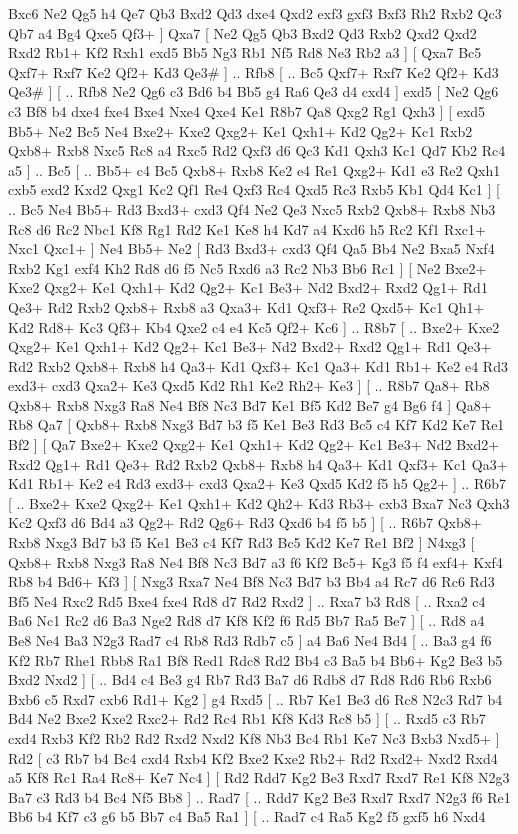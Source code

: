 Bxc6  Ne2 Qg5  h4 Qe7  Qb3 Bxd2  Qd3 dxe4  Qxd2 exf3  gxf3 Bxf3  Rh2 Rxb2  Qc3 Qb7  a4 Bg4  Qxe5 Qf3+   ]  Qxa7 [  Ne2 Qg5  Qb3 Bxd2  Qd3 Rxb2  Qxd2 Qxd2  Rxd2 Rb1+  Kf2 Rxh1  exd5 Bb5  Ng3 Rb1  Nf5 Rd8  Ne3 Rb2  a3   ]  [  Qxa7 Bc5  Qxf7+ Rxf7  Ke2 Qf2+  Kd3 Qe3#   ] .. Rfb8 [ .. Bc5  Qxf7+ Rxf7  Ke2 Qf2+  Kd3 Qe3#   ]  [ .. Rfb8  Ne2 Qg6  c3 Bd6  b4 Bb5  g4 Ra6  Qe3 d4  cxd4   ]  exd5 [  Ne2 Qg6  c3 Bf8  b4 dxe4  fxe4 Bxe4  Nxe4 Qxe4  Ke1 R8b7  Qa8 Qxg2  Rg1 Qxh3   ]  [  exd5 Bb5+  Ne2 Bc5  Ne4 Bxe2+  Kxe2 Qxg2+  Ke1 Qxh1+  Kd2 Qg2+  Kc1 Rxb2  Qxb8+ Rxb8  Nxc5 Rc8  a4 Rxc5  Rd2 Qxf3  d6 Qc3  Kd1 Qxh3  Kc1 Qd7  Kb2 Rc4  a5   ] .. Bc5 [ .. Bb5+  c4 Bc5  Qxb8+ Rxb8  Ke2 e4  Re1 Qxg2+  Kd1 e3  Re2 Qxh1  cxb5 exd2  Kxd2 Qxg1  Kc2 Qf1  Re4 Qxf3  Rc4 Qxd5  Rc3 Rxb5  Kb1 Qd4  Kc1   ]  [ .. Bc5  Ne4 Bb5+  Rd3 Bxd3+  cxd3 Qf4  Ne2 Qe3  Nxc5 Rxb2  Qxb8+ Rxb8  Nb3 Rc8  d6 Rc2  Nbc1 Kf8  Rg1 Rd2  Ke1 Ke8  h4 Kd7  a4 Kxd6  h5 Rc2  Kf1 Rxc1+  Nxc1 Qxc1+   ]  Ne4   Bb5+    Ne2 [  Rd3 Bxd3+  cxd3 Qf4  Qa5 Bb4  Ne2 Bxa5  Nxf4 Rxb2  Kg1 exf4  Kh2 Rd8  d6 f5  Nc5 Rxd6  a3 Rc2  Nb3 Bb6  Rc1   ]  [  Ne2 Bxe2+  Kxe2 Qxg2+  Ke1 Qxh1+  Kd2 Qg2+  Kc1 Be3+  Nd2 Bxd2+  Rxd2 Qg1+  Rd1 Qe3+  Rd2 Rxb2  Qxb8+ Rxb8  a3 Qxa3+  Kd1 Qxf3+  Re2 Qxd5+  Kc1 Qh1+  Kd2 Rd8+  Kc3 Qf3+  Kb4 Qxe2  c4 e4  Kc5 Qf2+  Kc6   ] .. R8b7 [ .. Bxe2+  Kxe2 Qxg2+  Ke1 Qxh1+  Kd2 Qg2+  Kc1 Be3+  Nd2 Bxd2+  Rxd2 Qg1+  Rd1 Qe3+  Rd2 Rxb2  Qxb8+ Rxb8  h4 Qa3+  Kd1 Qxf3+  Kc1 Qa3+  Kd1 Rb1+  Ke2 e4  Rd3 exd3+  cxd3 Qxa2+  Ke3 Qxd5  Kd2 Rh1  Ke2 Rh2+  Ke3   ]  [ .. R8b7  Qa8+ Rb8  Qxb8+ Rxb8  Nxg3 Ra8  Ne4 Bf8  Nc3 Bd7  Ke1 Bf5  Kd2 Be7  g4 Bg6  f4   ]  Qa8+   Rb8    Qa7 [  Qxb8+ Rxb8  Nxg3 Bd7  b3 f5  Ke1 Be3  Rd3 Bc5  c4 Kf7  Kd2 Ke7  Re1 Bf2   ]  [  Qa7 Bxe2+  Kxe2 Qxg2+  Ke1 Qxh1+  Kd2 Qg2+  Kc1 Be3+  Nd2 Bxd2+  Rxd2 Qg1+  Rd1 Qe3+  Rd2 Rxb2  Qxb8+ Rxb8  h4 Qa3+  Kd1 Qxf3+  Kc1 Qa3+  Kd1 Rb1+  Ke2 e4  Rd3 exd3+  cxd3 Qxa2+  Ke3 Qxd5  Kd2 f5  h5 Qg2+   ] .. R6b7 [ .. Bxe2+  Kxe2 Qxg2+  Ke1 Qxh1+  Kd2 Qh2+  Kd3 Rb3+  cxb3 Bxa7  Nc3 Qxh3  Kc2 Qxf3  d6 Bd4  a3 Qg2+  Rd2 Qg6+  Rd3 Qxd6  b4 f5  b5   ]  [ .. R6b7  Qxb8+ Rxb8  Nxg3 Bd7  b3 f5  Ke1 Be3  c4 Kf7  Rd3 Bc5  Kd2 Ke7  Re1 Bf2   ]  N4xg3 [  Qxb8+ Rxb8  Nxg3 Ra8  Ne4 Bf8  Nc3 Bd7  a3 f6  Kf2 Bc5+  Kg3 f5  f4 exf4+  Kxf4 Rb8  b4 Bd6+  Kf3   ]  [  Nxg3 Rxa7  Ne4 Bf8  Nc3 Bd7  b3 Bb4  a4 Rc7  d6 Rc6  Rd3 Bf5  Ne4 Rxc2  Rd5 Bxe4  fxe4 Rd8  d7 Rd2  Rxd2   ] .. Rxa7    b3   Rd8 [ .. Rxa2  c4 Ba6  Nc1 Rc2  d6 Ba3  Nge2 Rd8  d7 Kf8  Kf2 f6  Rd5 Bb7  Ra5 Be7   ]  [ .. Rd8  a4 Be8  Ne4 Ba3  N2g3 Rad7  c4 Rb8  Rd3 Rdb7  c5   ]  a4   Ba6    Ne4   Bd4 [ .. Ba3  g4 f6  Kf2 Rb7  Rhe1 Rbb8  Ra1 Bf8  Red1 Rdc8  Rd2 Bb4  c3 Ba5  b4 Bb6+  Kg2 Be3  b5 Bxd2  Nxd2   ]  [ .. Bd4  c4 Be3  g4 Rb7  Rd3 Ba7  d6 Rdb8  d7 Rd8  Rd6 Rb6  Rxb6 Bxb6  c5 Rxd7  cxb6 Rd1+  Kg2   ]  g4   Rxd5 [ .. Rb7  Ke1 Be3  d6 Rc8  N2c3 Rd7  b4 Bd4  Ne2 Bxe2  Kxe2 Rxc2+  Rd2 Rc4  Rb1 Kf8  Kd3 Rc8  b5   ]  [ .. Rxd5  c3 Rb7  cxd4 Rxb3  Kf2 Rb2  Rd2 Rxd2  Nxd2 Kf8  Nb3 Bc4  Rb1 Ke7  Nc3 Bxb3  Nxd5+   ]  Rd2 [  c3 Rb7  b4 Bc4  cxd4 Rxb4  Kf2 Bxe2  Kxe2 Rb2+  Rd2 Rxd2+  Nxd2 Rxd4  a5 Kf8  Rc1 Ra4  Rc8+ Ke7  Nc4   ]  [  Rd2 Rdd7  Kg2 Be3  Rxd7 Rxd7  Re1 Kf8  N2g3 Ba7  c3 Rd3  b4 Bc4  Nf5 Bb8   ] .. Rad7 [ .. Rdd7  Kg2 Be3  Rxd7 Rxd7  N2g3 f6  Re1 Bb6  b4 Kf7  c3 g6  b5 Bb7  c4 Ba5  Ra1   ]  [ .. Rad7  c4 Ra5  Kg2 f5  gxf5 h6  Nxd4 